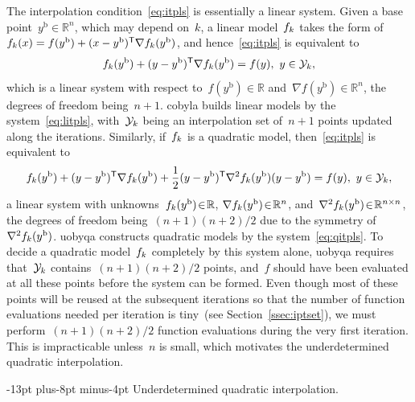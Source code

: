 \documentclass[smallextended,final]{svjour3}
\makeatletter
\newcommand{\R}{\mathbb{R}}
\newcommand{\T}{\mathsf{T}}
\newcommand{\base}{{\text{b}}}
\newcommand{\objm}[1][k]{\obj\ifthenelse{\equal{#1}{}}{}{_{#1}}}
\newcommand{\obj}{f}
\newcommand{\xpt}[1][k]{\mathcal{Y}\ifthenelse{\equal{#1}{}}{}{_{#1}}}
\def\paragraph{\@startsection{paragraph}{4}{\z@}%
    {-13pt plus-8pt minus-4pt}{\z@}
    {\normalsize\bfseries}}
\makeatother
\begin{document}
The interpolation condition~\eqref{eq:itpls} is essentially a linear system.
Given a base point~$y^{\base}\in \R^n$, which may depend on~$k$, a linear model~$\objm$ takes the form of~$\objm(x) = \obj(y^{\base}) + (x - y^{\base})^{\T} \nabla \objm(y^{\base})$, and hence~\eqref{eq:itpls} is equivalent to
\begin{equation}
    \label{eq:litpls}
    \objm(y^{\base}) + (y -y^{\base})^{\T} \nabla \objm(y^{\base}) = \obj(y), ~ y \in \xpt,
\end{equation}
which is a linear system with respect to~$\obj(y^\base) \in \R$ and~$\nabla \obj(y^\base) \in \R^n$, the degrees of freedom being~$n + 1$.
\Gls{cobyla} builds linear models by the system~\eqref{eq:litpls}, with~$\xpt$ being an interpolation set of~$n+1$ points updated along the iterations.
Similarly, if~$\objm$ is a quadratic model, then~\eqref{eq:itpls} is equivalent to
\begin{equation}
    \label{eq:qitpls}
    \objm(y^{\base}) + (y -y^{\base})^{\T} \nabla \objm(y^{\base}) + \frac{1}{2}(y-y^{\base})^{\T} \nabla^2 \objm(y^{\base}) (y-y^{\base}) = \obj(y), ~ y \in \xpt,
\end{equation}
a linear system with unknowns~$\objm(y^\base) \! \in \! \R$, $\nabla \objm(y^\base) \! \in \! \R^n$, and~$\nabla^2 \objm(y^{\base}) \! \in \! \R^{n \times n}$, the degrees of freedom being~$(n + 1)(n + 2) / 2$ due to the symmetry of~$\nabla^2 \objm(y^\base)$.
\Gls{uobyqa} constructs quadratic models by the system~\eqref{eq:qitpls}.
To decide a quadratic model~$\objm$ completely by this system alone, \gls{uobyqa} requires that~$\xpt$ contains~$(n+1)(n+2)/2$ points, and~$f$ should have been evaluated at all these points before the system can be formed.
Even though most of these points will be reused at the subsequent iterations so that the number of function evaluations needed per iteration is tiny~(see Section~\ref{ssec:iptset}), we must perform~$(n + 1)(n + 2) / 2$ function evaluations during the very first iteration.
This is impracticable unless~$n$ is small, which motivates the underdetermined quadratic interpolation.

\paragraph{Underdetermined quadratic interpolation.}
\end{document}
